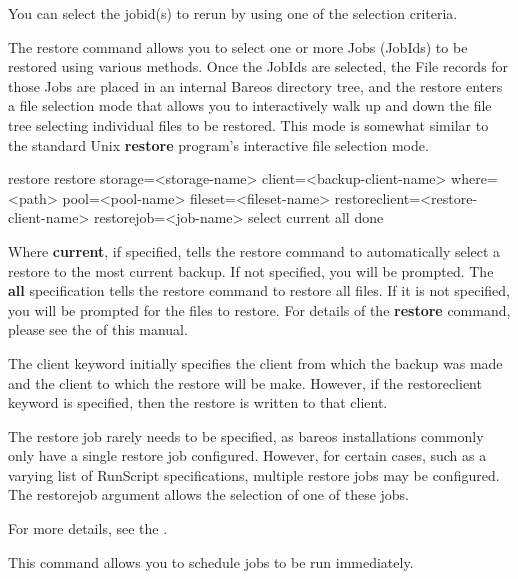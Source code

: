 \begin{description}
   You can select the jobid(s) to rerun by using one of the selection criteria.

\item [restore]
   \label{bcommandRestore}
   The restore command allows you to select one or more Jobs (JobIds) to be
   restored using various methods.  Once the JobIds are selected, the File
   records for those Jobs are placed in an internal Bareos directory tree,
   and the restore enters a file selection mode that allows you to
   interactively walk up and down the file tree selecting individual files
   to be restored.  This mode is somewhat similar to the standard Unix {\bf
   restore} program's interactive file selection mode.

\begin{bconsole}{restore}
restore storage=<storage-name> client=<backup-client-name>
  where=<path> pool=<pool-name> fileset=<fileset-name>
  restoreclient=<restore-client-name>
  restorejob=<job-name>
  select current all done
\end{bconsole}

   Where {\bf current}, if specified, tells the restore command to
   automatically select a restore to the most current backup.  If not
   specified, you will be prompted.  The {\bf all} specification tells the
   restore command to restore all files.  If it is not specified, you will
   be prompted for the files to restore.  For details of the {\bf restore}
   command, please see the  of this
   manual.

   The client keyword initially specifies the client from which the backup
   was made and the client to which the restore will be make.  However,
   if the restoreclient keyword is specified, then the restore is written
   to that client.

   The restore job rarely needs to be specified, as bareos installations
   commonly only have a single restore job configured. However, for certain
   cases, such as a varying list of RunScript specifications, multiple
   restore jobs may be configured. The restorejob argument allows the
   selection of one of these jobs.

    For more details, see the .

\item [run]
   This command allows you to schedule jobs  to be run immediately.


\end{description}
